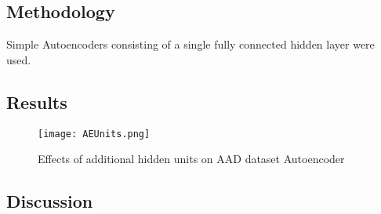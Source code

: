 \subsection{Methodology}
Simple Autoencoders consisting of a single fully connected hidden layer were used. 

\subsection{Results}

\begin{figure}[h]
    \centering
    \texttt{[image: AEUnits.png]}
    \caption{Effects of additional hidden units on AAD dataset Autoencoder}
    \label{fig:AEUnits}
\end{figure}


\subsection{Discussion}
 
